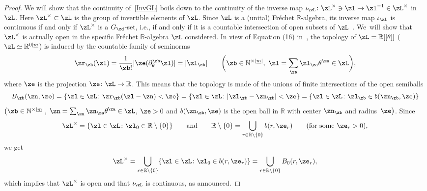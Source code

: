 \documentclass[pdftex]{sigma}%
\newcommand{\R}{{\mathbb R}}
\def\ul{\underline}
\def\ul{\underline}
\newcommand{\0}{\otimes}
\numberwithin{equation}{section}
\begin{document}
\begin{proof}
We will show that the continuity of~\eqref{InvGL} boils down to the continuity of the inverse map $\iota_\zL\colon \zL^{\times}\ni\zl\mapsto \zl^{-1}\in\zL^{\times}$ in $\zL$. Here $\zL^\times\subset\zL$ is the group of invertible elements of $\zL$. Since $\zL$ is a (unital) Fr\'echet $\R$-algebra, its inverse map $\iota_\zL$ is continuous if and only if $\zL^\times$ is a $G_\zd$-set, i.e., if and only if it is a countable intersection of open subsets of $\zL$~\cite{Waelbroeck:1971}. We~will show that $\zL^\times$ is actually open in the specific Fr\'echet $\R$-algebra $\zL$ considered. In view of Equation (16) in~\cite{Bruce:2018}, the topology of $\zL=\R[[\theta]]$ ($\zL\simeq\R^{0|\ul m}$) is induced by the countable family of seminorms
\[
\zr_\zb(\zl)=\frac{1}{\zb!}|\ze(\partial^\zb_\theta \zl)|=|\zl_\zb|\qquad \bigg(\zb\in\mathbb{N}^{\times|\ul m|},\ \zl=\sum_\za \zl_\za \theta^\za\in\zL\bigg),
\]
where $\ze$ is the projection $\ze\colon \zL\to \R$. This means that the topology is made of the unions of finite intersections of the open semiballs
\[
B_\zb(\zn,\ze)=\{\zl\in\zL\colon \zr_\zb(\zl-\zn)<\ze\}=\{\zl\in\zL\colon |\zl_\zb-\zn_\zb|<\ze\}=\{\zl\in\zL\colon \zl_\zb\in b(\zn_\zb,\ze)\}
\]
$\big(\zb\in\mathbb{N}^{\times |\ul m|}$, $\zn=\sum_\za \zn_\za\theta^\za\in\zL$, $\ze>0$ and $b(\zn_\zb,\ze)$ is the open ball in $\R$ with center $\zn_\zb$ and radius~$\ze\big)$. Since
\[
\zL^\times=\{\zl\in\zL\colon \zl_0\in\R\setminus\{0\}\}\qquad\text{and}\qquad \R\setminus\{0\}=\bigcup_{r\in\R\setminus\{0\}} b(r,\ze_r)\qquad (\text{for some}\ \ze_r>0),
\]
we get
\[
\zL^\times=\bigcup_{r\in\R\setminus\{0\}}\{\zl\in\zL\colon \zl_0\in b(r,\ze_r)\}=\bigcup_{r\in\R\setminus\{0\}}B_0(r,\ze_r),
\]
which implies that $\zL^\times$ is open and that $\iota_\zL$ is continuous, as announced.


\end{proof}
\end{document}
